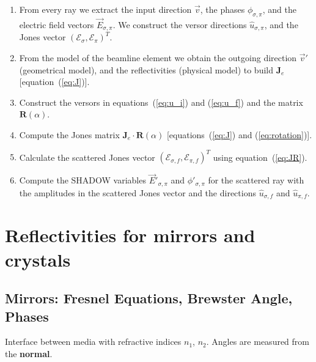 \documentclass{iucr}
\begin{document}
\begin{enumerate}

\item From every ray we extract the input direction $\vec{v}$, the phases $\phi_{\sigma,\pi}$, and the electric field vectors $\vec{E}_{\sigma,\pi}$. We construct the versor directions $\hat{u}_{\sigma,\pi}$, and the Jones vector $(\mathcal{E}_\sigma, \mathcal{E}_\pi)^T$.

\item From the model of the beamline element we obtain the outgoing direction $\vec{v}'$ (geometrical model), and the reflectivities (physical model) to build $\mathbf{J}_e$ [equation~(\ref{eq:J})].

\item Construct the versors in equations~(\ref{eq:u_i}) and (\ref{eq:u_f}) and the matrix $\textbf{R}(\alpha)$.


\item Compute the Jones matrix $\textbf{J}_e \cdot \textbf{R}(\alpha)$ [equations~(\ref{eq:J}) and (\ref{eq:rotation})].

\item Calculate the scattered Jones vector $(\mathcal{E}_{\sigma,f}, \mathcal{E}_{\pi,f})^T$ using equation~(\ref{eq:JR}).

\item Compute the SHADOW variables $\vec{E}'_{\sigma,\pi}$ and $\phi'_{\sigma,\pi}$ for the scattered ray with the amplitudes in the scattered Jones vector and the directions $\hat{u}_{\sigma,f}$ and $\hat{u}_{\pi,f}$.
\end{enumerate}


\section{Reflectivities for mirrors and crystals}\label{sec:mirrorandcrystals}

\subsection{Mirrors: Fresnel Equations, Brewster Angle, Phases}

Interface between media with refractive indices $n_1$, $n_2$.  
Angles are measured from the \textbf{normal}.
\end{document}
